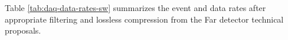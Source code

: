 Table \ref{tab:daq-data-rates-sw} summarizes the event and data rates after appropriate filtering and lossless compression from the Far detector technical proposals. 


